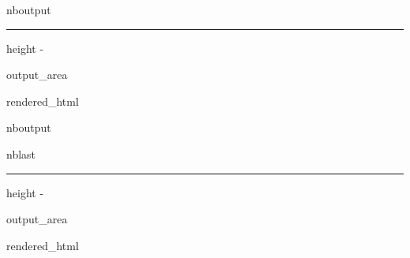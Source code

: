 \documentclass[letterpaper,10pt,english]{sphinxmanual}
\begin{document}
\begin{sphinxuseclass}{nboutput}
\hrule height -\fboxrule\relax
\vspace{\nbsphinxcodecellspacing}

\makeatletter\setbox\nbsphinxpromptbox\box\voidb@x\makeatother

\begin{nbsphinxfancyoutput}

\begin{sphinxuseclass}{output_area}
\begin{sphinxuseclass}{rendered_html}


\end{sphinxuseclass}
\end{sphinxuseclass}
\end{nbsphinxfancyoutput}

\end{sphinxuseclass}
\begin{sphinxuseclass}{nboutput}
\begin{sphinxuseclass}{nblast}
\hrule height -\fboxrule\relax
\vspace{\nbsphinxcodecellspacing}

\makeatletter\setbox\nbsphinxpromptbox\box\voidb@x\makeatother

\begin{nbsphinxfancyoutput}

\begin{sphinxuseclass}{output_area}
\begin{sphinxuseclass}{rendered_html}


\end{sphinxuseclass}
\end{sphinxuseclass}
\end{nbsphinxfancyoutput}

\end{sphinxuseclass}
\end{sphinxuseclass}
\sphinxstepscope
\end{document}
